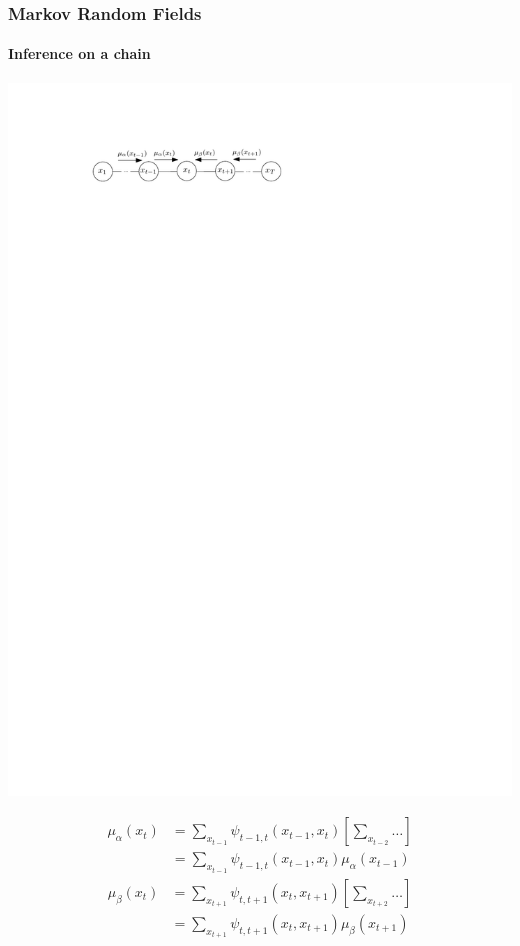 \documentclass[slidestop,compress,mathserif]{beamer}
\begin{document}
\begin{frame}
	\frametitle{Markov Random Fields}
	\framesubtitle{Inference on a chain}
    \begin{center}
    \includegraphics[width=.6\textwidth]{chain2}
    \end{center}
    \begin{align*}
    \mu_\alpha(x_t) & = 
    \sum_{x_{t-1}}\psi_{t-1,t}(x_{t-1},x_t)\left[\sum_{x_{t-2}}\hdots\right]\\
        & = 
    \sum_{x_{t-1}}\psi_{t-1,t}(x_{t-1},x_t)\mu_\alpha(x_{t-1})
    \end{align*}
    \begin{align*}
    \mu_\beta(x_t) & = 
    \sum_{x_{t+1}}\psi_{t,t+1}(x_{t},x_{t+1})\left[\sum_{x_{t+2}}\hdots\right]\\
        & = 
    \sum_{x_{t+1}}\psi_{t,t+1}(x_{t},x_{t+1})\mu_\beta(x_{t+1})
    \end{align*}
  \end{frame} 
\end{document}
